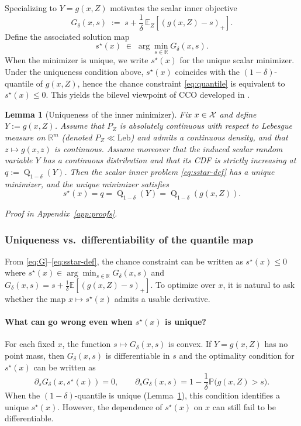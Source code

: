 \documentclass{uai2026} %
\theoremstyle{plain}
\newtheorem{lemma}{Lemma}
\theoremstyle{definition}
\newcommand{\Q}{\operatorname{Q}}
\begin{document}
Specializing to $Y=g(x,Z)$ motivates the scalar inner objective
\begin{equation}
  G_\delta(x,s)\;:=\; s + \frac{1}{\delta}\,\mathbb{E}_Z\!\left[(g(x,Z)-s)_+\right].\label{eq:G}
\end{equation}
Define the associated solution map
\begin{equation}
  s^\star(x)\;\in\;\arg\min_{s\in\mathbb{R}} G_\delta(x,s).\label{eq:sstar-def}
\end{equation}
When the minimizer is unique, we write $s^\star(x)$ for the unique scalar minimizer.
Under the uniqueness condition above, $s^\star(x)$ coincides with the $(1-\delta)$-quantile of $g(x,Z)$, hence the chance constraint \eqref{eq:quantile} is equivalent to $s^\star(x)\le 0$.
This yields the bilevel viewpoint of CCO developed in \citet{laguelmalickackooij2021bilevel}.

\begin{lemma}[Uniqueness of the inner minimizer]\label{lem:unique-sstar}
Fix $x\in\mathcal{X}$ and define $Y:=g(x,Z)$.
Assume that $P_Z$ is absolutely continuous with respect to Lebesgue measure on $\mathbb{R}^{m}$ (denoted $P_Z\ll \mathrm{Leb}$) and admits a continuous density, and that $z\mapsto g(x,z)$ is continuous.
Assume moreover that the induced scalar random variable $Y$ has a continuous distribution and that its CDF is strictly increasing at $q:=\Q_{1-\delta}(Y)$.
Then the scalar inner problem \eqref{eq:sstar-def} has a unique minimizer, and the unique minimizer satisfies
\[
  s^\star(x)=q=\Q_{1-\delta}(Y)=\Q_{1-\delta}(g(x,Z)).
\]
\end{lemma}
\emph{Proof in Appendix~\ref{app:proofs}.}

\subsubsection{Uniqueness vs.\ differentiability of the quantile map}

From \eqref{eq:G}--\eqref{eq:sstar-def}, the chance constraint can be written as $s^\star(x)\le 0$ where
$s^\star(x)\in\arg\min_{s\in\mathbb{R}} G_\delta(x,s)$ and $G_\delta(x,s)=s+\frac{1}{\delta}\mathbb{E}[(g(x,Z)-s)_+]$.
To optimize over $x$, it is natural to ask whether the map $x\mapsto s^\star(x)$ admits a usable derivative.

\paragraph{What can go wrong even when $s^\star(x)$ is unique?}
For each fixed $x$, the function $s\mapsto G_\delta(x,s)$ is convex.
If $Y=g(x,Z)$ has no point mass, then $G_\delta(x,s)$ is differentiable in $s$ and the optimality condition for $s^\star(x)$ can be written as
\[
  \partial_s G_\delta(x,s^\star(x))=0,
  \qquad
  \partial_s G_\delta(x,s)=1-\frac{1}{\delta}\mathbb{P}\big(g(x,Z)>s\big).
\]
When the $(1-\delta)$-quantile is unique (Lemma~\ref{lem:unique-sstar}), this condition identifies a unique $s^\star(x)$.
However, the dependence of $s^\star(x)$ on $x$ can still fail to be differentiable.
\end{document}
